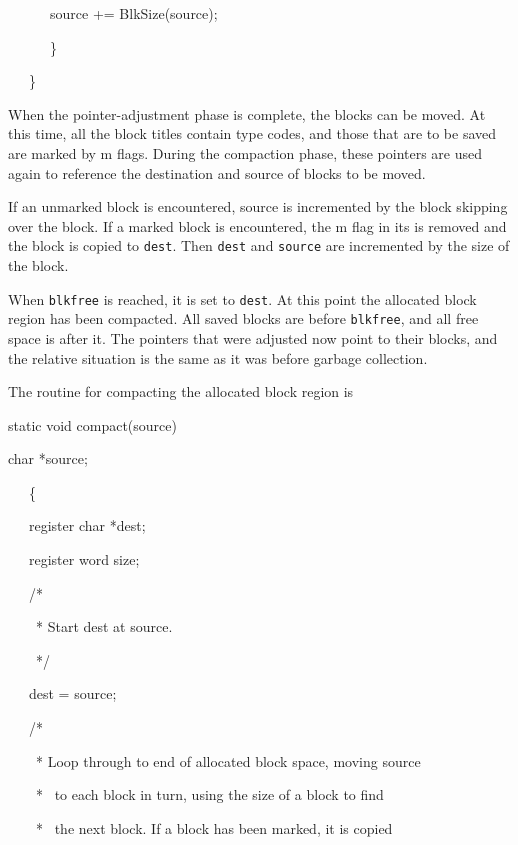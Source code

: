 {\ttfamily\mdseries
\ \ \ \ \ \ source += BlkSize(source);
}

{\ttfamily\mdseries
\ \ \ \ \ \ \}
}

{\ttfamily\mdseries
\ \ \ \}}

When the pointer-adjustment phase is complete, the blocks can be
moved. At this time, all the block titles contain type codes, and
those that are to be saved are marked by m flags. During the
compaction phase, these pointers are used again to reference the
destination and source of blocks to be moved.

If an unmarked block is encountered, source is incremented by the
block skipping over the block. If a marked block is encountered, the m
flag in its is removed and the block is copied to \texttt{dest}. Then
\texttt{dest} and \texttt{source} are incremented by the size of the
block.

When \texttt{blkfree} is reached, it is set to \texttt{dest}. At this
point the allocated block region has been compacted. All saved blocks
are before \texttt{blkfree}, and all free space is after it. The
pointers that were adjusted now point to their blocks, and the
relative situation is the same as it was before garbage collection.

The routine for compacting the allocated block region is

{\ttfamily\mdseries
static void compact(source)
}

{\ttfamily\mdseries
char *source;
}

{\ttfamily\mdseries
\ \ \ \{
}

{\ttfamily\mdseries
\ \ \ register char *dest;
}

{\ttfamily\mdseries
\ \ \ register word size;
}

\bigskip

{\ttfamily\mdseries
\ \ \ /*
}

{\ttfamily\mdseries
\ \ \ \ * Start dest at source.
}

{\ttfamily\mdseries
\ \ \ \ */
}

{\ttfamily\mdseries
\ \ \ dest = source;
}


\bigskip

{\ttfamily\mdseries
\ \ \ /*
}

{\ttfamily\mdseries
\ \ \ \ * Loop through to end of allocated block space, moving source}

{\ttfamily\mdseries
\ \ \ \ * \ to each block in turn, using the size of a block to find}

{\ttfamily\mdseries
\ \ \ \ * \ the next block. If a block has been marked, it is copied}

